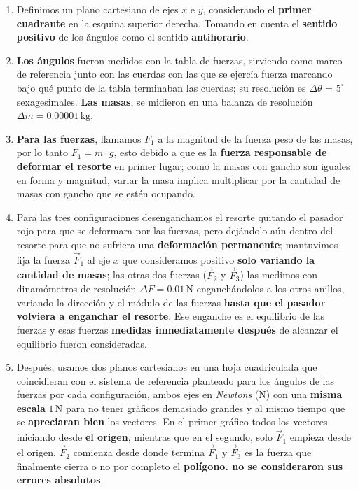 \documentclass[12pt,a4paper]{article}
\begin{document}
\begin{enumerate}[label=\alph*)]

\item Definimos un plano cartesiano de ejes $x$ e $y$, considerando el \textbf{primer cuadrante} en la esquina superior derecha. Tomando en cuenta el \textbf{sentido positivo} de los ángulos como el sentido \textbf{antihorario}. 
\item \textbf{Los ángulos} fueron medidos con la tabla de fuerzas, sirviendo como marco de referencia junto con las cuerdas con las que se ejercía fuerza marcando bajo qué punto de la tabla terminaban las cuerdas; su resolución es $\Delta \theta$ = $5^{\circ}$ sexagesimales. \textbf{Las masas}, se midieron en una balanza de resolución $\Delta m = 0.00001 \,\mathrm{kg}$. 
\item \textbf{Para las fuerzas}, llamamos $F_1$ a la magnitud de la fuerza peso de las masas, por lo tanto $F_1 = m \cdot g$, esto debido a que es la \textbf{fuerza responsable de deformar el resorte} en primer lugar; como la masas con gancho son iguales en forma y magnitud, variar la masa implica multiplicar por la cantidad de masas con gancho que se estén ocupando.
\item Para las tres configuraciones desenganchamos el resorte quitando el pasador rojo para que se deformara por las fuerzas, pero dejándolo aún dentro del resorte para que no sufriera una \textbf{deformación permanente}; mantuvimos fija la fuerza $\vec{F}_1$ al eje $x$ que consideramos positivo \textbf{solo variando la cantidad de masas}; las otras dos fuerzas ($\vec{F}_2$ y $\vec{F}_3$) las medimos con dinamómetros de resolución $\Delta F = 0.01 \,\mathrm{N}$ enganchándolos a los otros anillos,  variando la dirección y el módulo de las fuerzas \textbf{hasta que el pasador volviera a enganchar el resorte}. Ese enganche es el equilibrio de las fuerzas y esas fuerzas \textbf{medidas inmediatamente después} de alcanzar el equilibrio fueron consideradas.
\item Después, usamos dos planos cartesianos en una hoja cuadriculada que coincidieran con el sistema de referencia planteado para los ángulos de las fuerzas por cada configuración, ambos ejes en {\em{Newtons}} ($\mathrm{N}$) con una \textbf{misma escala} $1 \,\mathrm{N}$ para no tener gráficos demasiado grandes y al mismo tiempo que se \textbf{apreciaran bien} los vectores. En el primer gráfico todos los vectores iniciando desde \textbf{el origen}, mientras que en el segundo, solo $\vec{F}_1$ empieza desde el origen, $\vec{F}_2$ comienza desde donde termina $\vec{F}_1$ y $\vec{F}_3$ es la fuerza que finalmente cierra o no por completo el \textbf{polígono. no se consideraron sus errores absolutos}.
\end{enumerate}
\end{document}
